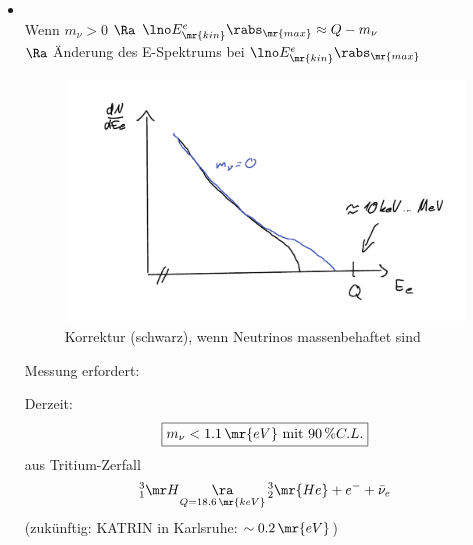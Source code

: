 \begin{itemize}
\item {}\\
Wenn $m_\nu > 0$ $\Ra$ $\lno E_\mr{kin}^e\rabs_\mr{max} \approx Q-m_\nu$\\
$\Ra$ Änderung des E-Spektrums bei $\lno E^e_\mr{kin}\rabs_\mr{max}$
\begin{figure}[!ht]
\centering
\includegraphics[width=.5\textwidth]{imgs/ep5-fig-5-10.pdf}
\caption{Korrektur (schwarz), wenn Neutrinos massenbehaftet sind\label{fig:5.10}}
\end{figure}

Messung erfordert:
Derzeit:
\begin{align}
\boxed{m_\nu < 1.1\,\mr{eV} \text{ mit } 90\,\% C.L.}
\end{align}
aus Tritium-Zerfall
\begin{align*}
^3_1\mr H \underset{Q=18.6\,\mr{keV}}{\ra}\, ^3_2 \mr{He} + e^- + \bar{\nu}_e
\end{align*}
(zukünftig: KATRIN in Karlsruhe: $\sim 0.2\,\mr{eV}$)
\end{itemize}

